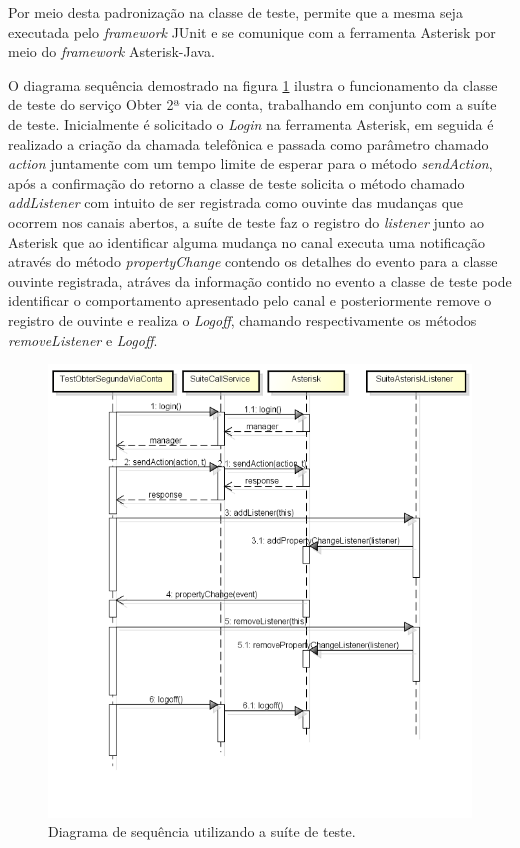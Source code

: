 Por meio desta padronização na classe de teste, permite que a mesma seja executada pelo \textit{framework} JUnit e se comunique com a ferramenta Asterisk por meio do \textit{framework} Asterisk-Java.

O diagrama sequência demostrado na figura \ref{figura:diagramaSeq2Via} ilustra o funcionamento da classe de teste do serviço Obter 2ª via de conta, trabalhando em conjunto com a suíte de teste.
Inicialmente é solicitado o \textit{Login} na ferramenta Asterisk, em seguida é realizado a criação da chamada telefônica e passada como parâmetro chamado \textit{action} juntamente com um tempo limite de esperar para o método \textit{sendAction}, após a confirmação do retorno a classe de teste solicita o método chamado \textit{addListener} com intuito de ser registrada como ouvinte das mudanças que ocorrem nos canais abertos, a suíte de teste faz o registro do \textit{listener} junto ao Asterisk que ao identificar alguma mudança no canal executa uma notificação através do método \textit{propertyChange} contendo os detalhes do evento para a classe ouvinte registrada, atráves da informação contido no evento a classe de teste pode identificar o comportamento apresentado pelo canal e posteriormente remove o registro de ouvinte e realiza o \textit{Logoff}, chamando respectivamente os métodos \textit{removeListener} e \textit{Logoff}.

\begin{figure}[H]
	\centering
	\caption{Diagrama de sequência utilizando a suíte de teste.}
	\label{figura:diagramaSeq2Via}
	\includegraphics{figuras/diagramaSequenciaObter2Via.png}
\end{figure}


